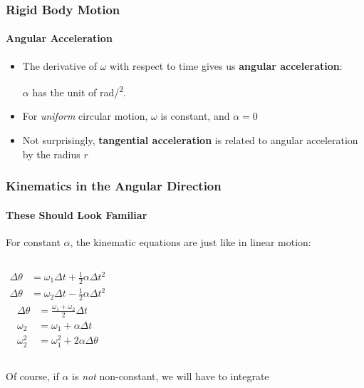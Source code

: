 \documentclass[12pt,compress,aspectratio=169]{beamer}
\begin{document}
\begin{frame}
  \frametitle{Rigid Body Motion}
  \framesubtitle{Angular Acceleration}
  \begin{itemize}
  \item The derivative of $\omega$ with respect to time gives us
    \textbf{angular acceleration}:


    \vspace{-0.1in}$\alpha$ has the unit of \si{rad/\sec^2}.

  \item For \emph{uniform} circular motion, $\omega$ is constant, and $\alpha=0$
  \item Not surprisingly, \textbf{tangential acceleration} is related to
    angular acceleration by the radius $r$
    

  \end{itemize}
\end{frame}


\begin{frame}
  \frametitle{Kinematics in the Angular Direction}
  \framesubtitle{These Should Look Familiar}
  For constant $\alpha$, the kinematic equations are just like in linear
  motion:
  
  \begin{columns}
    {\LARGE
      \begin{align*}
        \Delta\theta&=\omega_1\Delta t + \frac{1}{2}\alpha\Delta t^2\\
        \Delta\theta&=\omega_2\Delta t - \frac{1}{2}\alpha\Delta t^2
      \end{align*}
    }
    {\LARGE
      \begin{align*}
        \Delta\theta&=\frac{\omega_1+\omega_2}{2} \Delta t\\
        \omega_2&= \omega_1+ \alpha\Delta t\\
        \omega_2^2& = \omega_1^2+ 2\alpha\Delta\theta
      \end{align*}
    }
  \end{columns}
  Of course, if $\alpha$ is \emph{not} non-constant, we will have to integrate
\end{frame}
\end{document}
